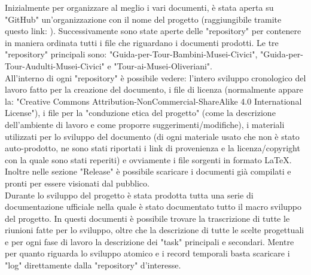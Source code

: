 \documentclass[hidelinks,12pt,a4paper]{article}
\begin{document}
\begin{flushleft}
				 \bigskip
				 Inizialmente per organizzare al meglio i vari documenti, è stata aperta su "GitHub" un'organizzazione con il nome del progetto (raggiungibile tramite questo link: ). Successivamente sono state aperte delle "repository" per contenere in maniera ordinata tutti i file che riguardano i documenti prodotti. Le tre "repository" principali sono: "Guida-per-Tour-Bambini-Musei-Civici", "Guida-per-Tour-Audulti-Musei-Civici" e "Tour-ai-Musei-Oliveriani".\\
				 All'interno di ogni "repository" è possibile vedere: l'intero sviluppo cronologico del lavoro fatto per la creazione del documento,  i file di licenza (normalmente appare la: "Creative Commons Attribution-NonCommercial-ShareAlike 4.0 International License"), i file per la "conduzione etica del progetto" (come la descrizione dell'ambiente di lavoro e come proporre suggerimenti/modifiche), i materiali utilizzati per lo sviluppo del documento (di ogni materiale usato che non è stato auto-prodotto, ne sono stati riportati i link di provenienza e la licenza/copyright con la quale sono stati reperiti) e ovviamente i file sorgenti in formato \LaTeX. Inoltre nelle sezione "Release" è possibile scaricare i documenti già compilati e pronti per essere visionati dal pubblico.\\
				 Durante lo sviluppo del progetto è stata prodotta tutta una serie di documentazione ufficiale nella quale è stato documentato tutto il macro sviluppo del progetto. In questi documenti è possibile trovare la trascrizione di tutte le riunioni fatte per lo sviluppo, oltre che la descrizione di tutte le scelte progettuali e per ogni fase di lavoro la descrizione dei "task" principali e secondari. Mentre per quanto riguarda lo sviluppo atomico e i record temporali basta scaricare i "log" direttamente dalla "repository" d'interesse.
				 


\end{flushleft}
\end{document}
